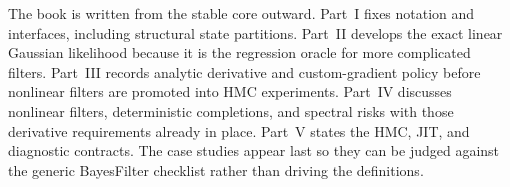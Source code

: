 The book is written from the stable core outward.  Part~I fixes notation and
interfaces, including structural state partitions.  Part~II develops the exact
linear Gaussian likelihood because it is the regression oracle for more
complicated filters.  Part~III records analytic derivative and custom-gradient
policy before nonlinear filters are promoted into HMC experiments.  Part~IV
discusses nonlinear filters, deterministic completions, and spectral risks with
those derivative requirements already in place.  Part~V states the HMC, JIT,
and diagnostic contracts.  The case studies appear last so they can be judged
against the generic BayesFilter checklist rather than driving the definitions.
